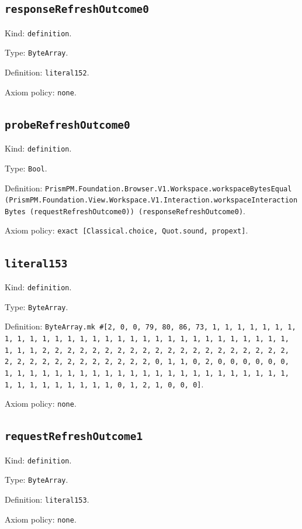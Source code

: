 \documentclass[11pt]{article}
\begin{document}
\subsection*{\texttt{responseRefreshOutcome0}}
\noindent Kind: \texttt{definition}.\par
\noindent Type: \texttt{ByteArray}.\par
\noindent Definition: \texttt{literal152}.\par
\noindent Axiom policy: \texttt{none}.\par
\subsection*{\texttt{probeRefreshOutcome0}}
\noindent Kind: \texttt{definition}.\par
\noindent Type: \texttt{Bool}.\par
\noindent Definition: \texttt{PrismPM.Foundation.Browser.V1.Workspace.workspaceBytesEqual (PrismPM.Foundation.View.Workspace.V1.Interaction.workspaceInteractionBytes (requestRefreshOutcome0)) (responseRefreshOutcome0)}.\par
\noindent Axiom policy: \texttt{exact [Classical.choice, Quot.sound, propext]}.\par
\subsection*{\texttt{literal153}}
\noindent Kind: \texttt{definition}.\par
\noindent Type: \texttt{ByteArray}.\par
\noindent Definition: \texttt{ByteArray.mk \#[2, 0, 0, 79, 80, 86, 73, 1, 1, 1, 1, 1, 1, 1, 1, 1, 1, 1, 1, 1, 1, 1, 1, 1, 1, 1, 1, 1, 1, 1, 1, 1, 1, 1, 1, 1, 1, 1, 1, 1, 2, 2, 2, 2, 2, 2, 2, 2, 2, 2, 2, 2, 2, 2, 2, 2, 2, 2, 2, 2, 2, 2, 2, 2, 2, 2, 2, 2, 2, 2, 2, 2, 0, 1, 1, 0, 2, 0, 0, 0, 0, 0, 0, 1, 1, 1, 1, 1, 1, 1, 1, 1, 1, 1, 1, 1, 1, 1, 1, 1, 1, 1, 1, 1, 1, 1, 1, 1, 1, 1, 1, 1, 1, 1, 1, 0, 1, 2, 1, 0, 0, 0]}.\par
\noindent Axiom policy: \texttt{none}.\par
\subsection*{\texttt{requestRefreshOutcome1}}
\noindent Kind: \texttt{definition}.\par
\noindent Type: \texttt{ByteArray}.\par
\noindent Definition: \texttt{literal153}.\par
\noindent Axiom policy: \texttt{none}.\par
\end{document}
